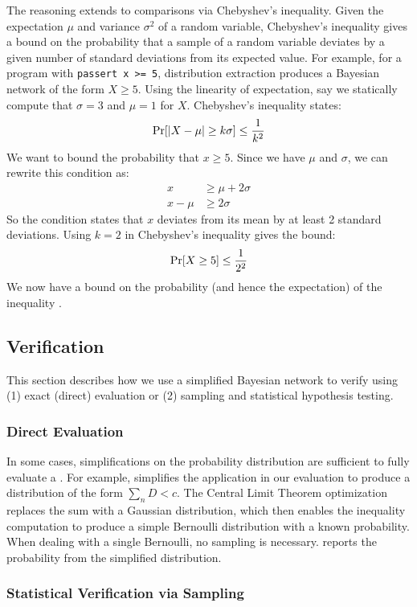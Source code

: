 The reasoning extends to comparisons via Chebyshev's inequality.
Given the expectation $\mu$ and variance $\sigma^2$ of a random variable,
Chebyshev's inequality
gives a bound on the probability that a sample of a random variable deviates
by a given number of standard deviations from its expected value.
For example, for a program with
\lstinline{passert x >= 5}, distribution extraction produces a Bayesian
network of the form $X \ge 5$.
Using the linearity of expectation, say we statically compute that $\sigma = 3$ and $\mu = 1$ for
$X$. Chebyshev's inequality states:
%
$$\Pr\!\left[|X - \mu| \ge k\sigma\right] \le \frac{1}{k^2}$$
%
We want to bound the probability that $x \ge 5$. Since we have $\mu$ and $\sigma$, we can rewrite this condition as:
%
\begin{align*}
x &\ge \mu + 2\sigma \\
x - \mu &\ge 2\sigma
\end{align*}
%
So the \passert condition states that $x$ deviates from its mean by at least 2
standard deviations. Using $k=2$ in Chebyshev's inequality gives the bound:
%
$$\Pr\!\left[X \ge 5\right] \le \frac{1}{2^2}$$
%
We now have a bound on the probability (and hence the expectation) of the
inequality .


\subsection{Verification}
\label{passert:sec:verification}
This section describes how we use a simplified Bayesian network to verify
\passerts using (1) exact (direct) evaluation or (2) sampling and
statistical hypothesis testing.

\subsubsection{Direct Evaluation}
\label{passert:sec:exact}
In some cases, simplifications on the probability distribution are
sufficient to fully evaluate a \passert. For example, \tool simplifies
the  application in our evaluation to produce a
distribution of the form $\sum_n D < c$. The Central Limit Theorem
optimization replaces the sum with a Gaussian distribution, which then
enables the inequality computation to produce a simple Bernoulli
distribution with a known probability.  When dealing with a single
Bernoulli, no sampling is necessary. \tool reports the probability
from the simplified distribution.

\subsubsection{Statistical Verification via Sampling}
\label{passert:sec:sample}


